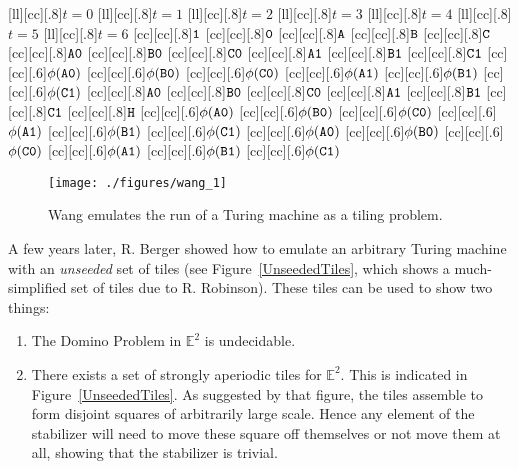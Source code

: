 \documentclass[12pt,reqno]{amsart}
\theoremstyle{plain}
\theoremstyle{definition}
\numberwithin{subcase}{case}
\theoremstyle{plain}
\theoremstyle{definition}
\begin{document}
[ll][cc][.8]{$t=0$}
[ll][cc][.8]{$t=1$}
[ll][cc][.8]{$t=2$}
[ll][cc][.8]{$t=3$}
[ll][cc][.8]{$t=4$}
[ll][cc][.8]{$t=5$}
[ll][cc][.8]{$t=6$}  
[cc][cc][.8]{${\tt 1}$}    %
[cc][cc][.8]{${\tt 0}$}
[cc][cc][.8]{${\tt A}$}
[cc][cc][.8]{${\tt B}$}
[cc][cc][.8]{${\tt C}$}
[cc][cc][.8]{${\tt A  0}$}
[cc][cc][.8]{${\tt B 0}$}
[cc][cc][.8]{${\tt C 0}$}
[cc][cc][.8]{${\tt A 1}$}
[cc][cc][.8]{${\tt B 1}$}
[cc][cc][.8]{${\tt C 1}$}
[cc][cc][.6]{$\phi({\tt A  0})$}
[cc][cc][.6]{$\phi({\tt B 0})$}
[cc][cc][.6]{$\phi({\tt C 0})$}
[cc][cc][.6]{$\phi({\tt A 1})$}
[cc][cc][.6]{$\phi({\tt B 1})$}
[cc][cc][.6]{$\phi({\tt C 1})$}
[cc][cc][.8]{${\tt A  0}$}
[cc][cc][.8]{${\tt B 0}$}
[cc][cc][.8]{${\tt C 0}$}
[cc][cc][.8]{${\tt A 1}$}
[cc][cc][.8]{${\tt B 1}$}
[cc][cc][.8]{${\tt C 1}$}
[cc][cc][.8]{${\tt H}$}
\psfrag{!}[cc][cc][.6]{$\phi({\tt A  0})$}
[cc][cc][.6]{$\phi({\tt B 0})$}
\psfrag{#}[cc][cc][.6]{$\phi({\tt C 0})$}
\psfrag{^}[cc][cc][.6]{$\phi({\tt A 1})$}
\psfrag{&}[cc][cc][.6]{$\phi({\tt B 1})$}
\psfrag{*}[cc][cc][.6]{$\phi({\tt C 1})$}
\psfrag{,}[cc][cc][.6]{$\phi({\tt A  0})$}
[cc][cc][.6]{$\phi({\tt B 0})$}
\psfrag{/}[cc][cc][.6]{$\phi({\tt C 0})$}
\psfrag{<}[cc][cc][.6]{$\phi({\tt A 1})$}
\psfrag{>}[cc][cc][.6]{$\phi({\tt B 1})$}
[cc][cc][.6]{$\phi({\tt C 1})$}


\begin{figure}
\centerline{{\texttt{[image: ./figures/wang\_1]}} }
\caption{Wang emulates the run of a Turing machine as a tiling problem.}
\label{wangrun}
\end{figure}

A few years later, R. Berger showed how to emulate an arbitrary Turing machine with an {\it unseeded} set of tiles (see Figure~\ref{UnseededTiles}, which shows a much-simplified set of tiles due to R. Robinson).  These tiles can be used to show two things:
\begin{enumerate}
\item The Domino Problem in \(\mathbb{E}^{2}\) is undecidable. 
\item There exists a set of strongly aperiodic tiles for \(\mathbb{E}^{2}\). This is indicated in Figure~\ref{UnseededTiles}. As suggested by that figure, the tiles assemble to form disjoint squares of arbitrarily large scale. Hence any element of the stabilizer will need to move these square off themselves or not move them at all, showing that the stabilizer is trivial.
\end{enumerate}
\end{document}
